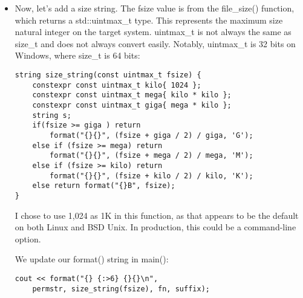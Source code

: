 \begin{itemize}
We add this definition to the top of our print\_dir() function:

\begin{lstlisting}[style=styleCXX]
const auto permstr{ type_char(fstat) + rwx(fperm) };
\end{lstlisting}

We update our format() string:

\begin{lstlisting}[style=styleCXX]
cout << format("{} {}{}\n", permstr, fn, suffix);
\end{lstlisting}

And we get this output:

\begin{tcblisting}{commandshell={}}
-rwxr-xr-x chrono*
-rw-r--r-- chrono.cpp
-rwxr-xr-x formatter*
-rw-r--r-- formatter.cpp
lrwxr-xr-x include -> /Users/billw/include
-rw-r--r-- Makefile
drwxr-xr-x testdir/
-rwxr-xr-x working*
-rw-r--r-- working.cpp
\end{tcblisting}

\item 
Now, let's add a size string. The fsize value is from the file\_size() function, which returns a std::uintmax\_t type. This represents the maximum size natural integer on the target system. uintmax\_t is not always the same as size\_t and does not always convert easily. Notably, uintmax\_t is 32 bits on Windows, where size\_t is 64 bits:

\begin{lstlisting}[style=styleCXX]
string size_string(const uintmax_t fsize) {
	constexpr const uintmax_t kilo{ 1024 };
	constexpr const uintmax_t mega{ kilo * kilo };
	constexpr const uintmax_t giga{ mega * kilo };
	string s;
	if(fsize >= giga ) return
		format("{}{}", (fsize + giga / 2) / giga, 'G');
	else if (fsize >= mega) return
		format("{}{}", (fsize + mega / 2) / mega, 'M');
	else if (fsize >= kilo) return
		format("{}{}", (fsize + kilo / 2) / kilo, 'K');
	else return format("{}B", fsize);
}
\end{lstlisting}

I chose to use 1,024 as 1K in this function, as that appears to be the default on both Linux and BSD Unix. In production, this could be a command-line option.

We update our format() string in main():

\begin{lstlisting}[style=styleCXX]
cout << format("{} {:>6} {}{}\n",
	permstr, size_string(fsize), fn, suffix);
\end{lstlisting}


\end{itemize}
